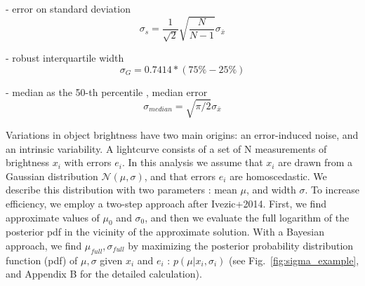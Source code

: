 \documentclass[fleqn,usenatbib]{mnras}  %
\begin{document}
- error on standard deviation 
\begin{equation}
\sigma_{s} = \frac{1}{\sqrt{2}}\sqrt{\frac{N}{N-1}} \sigma_{\bar{x}}
\end{equation}

- robust interquartile width
\begin{equation}
\sigma_{G} = 0.7414 * (75\% - 25\%) 
\end{equation}

- median as the 50-th percentile , median error 
\begin{equation}
\sigma_{median} = \sqrt{\pi/2}\sigma_{\bar{x}}
\end{equation}
 



%
%

Variations in object brightness  have two main origins:  an  error-induced noise, and an intrinsic variability. A lightcurve consists of a set of N measurements of brightness  $x_{i}$  with  errors  $e_{i}$. In this analysis we assume that  $x_{i}$ are drawn from a Gaussian distribution  $\mathcal{N}(\mu,\sigma)$, and that errors $e_{i}$ are homoscedastic. We describe this distribution with two parameters : mean $\mu$, and width $\sigma$. To increase efficiency, we employ a two-step  approach after Ivezic+2014. 
First, we find approximate values of  $\mu_{0}$ and $\sigma_{0}$, and then we evaluate the full logarithm of the posterior pdf in the vicinity of the approximate solution.
With a Bayesian approach, we find $\mu_{full},\sigma_{full}$  by maximizing  the posterior probability distribution function (pdf) of  $\mu,\sigma$ given $x_{i}$ and $e_{i}$ : $p(\mu | {x_{i}},{\sigma_{i}})$ (see Fig.~\ref{fig:sigma_example}, and Appendix B for the detailed calculation). 
\end{document}
